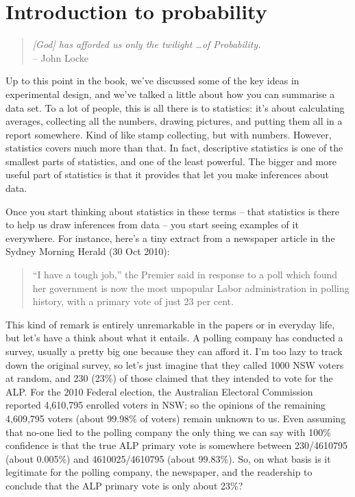 

\chapter{Introduction to probability\label{ch:probability}}

\begin{quote}
{\it [God] has afforded us only the twilight \ldots of Probability.} \\
\hspace*{2cm} -- John Locke
\end{quote}
\vspace*{12pt}

\noindent
Up to this point in the book, we've discussed some of the key ideas in experimental design, and we've talked a little about how you can summarise a data set.  To a lot of people, this is all there is to statistics: it's about calculating averages, collecting all the numbers, drawing pictures, and putting them all in a report somewhere. Kind of like stamp collecting, but with numbers. However, statistics covers much more than that. In fact, descriptive statistics is one of the smallest parts of statistics, and one of the least powerful. The bigger and more useful part of statistics is that it provides that let you make inferences about data. 

Once you start thinking about statistics in these terms -- that statistics is there to help us draw inferences from data -- you start seeing examples of it everywhere. For instance, here's a tiny extract from a newspaper article in the Sydney Morning Herald (30 Oct 2010):
\small
\begin{quote}
``I have a tough job,'' the Premier said in response to a poll which found her government is now the most unpopular Labor administration in polling history, with a primary vote of just 23 per cent.
\end{quote}
\normalsize
This kind of remark is entirely unremarkable in the papers or in everyday life, but let's have a think about what it entails. A polling company has conducted a survey, usually a pretty big one because they can afford it. I'm too lazy to track down the original survey, so let's just imagine that they called 1000 NSW voters at random, and 230 (23\%) of those claimed that they intended to vote for the ALP. For the 2010 Federal election, the Australian Electoral Commission reported 4,610,795 enrolled voters in NSW; so the opinions of the remaining 4,609,795 voters (about 99.98\% of voters) remain unknown to us. Even assuming that no-one lied to the polling company the only thing we can say with 100\% confidence is that the true ALP primary vote is somewhere between 230/4610795 (about 0.005\%) and 4610025/4610795 (about 99.83\%). So, on what basis is it legitimate for the polling company, the newspaper, and the readership to conclude that the ALP primary vote is only about 23\%?

